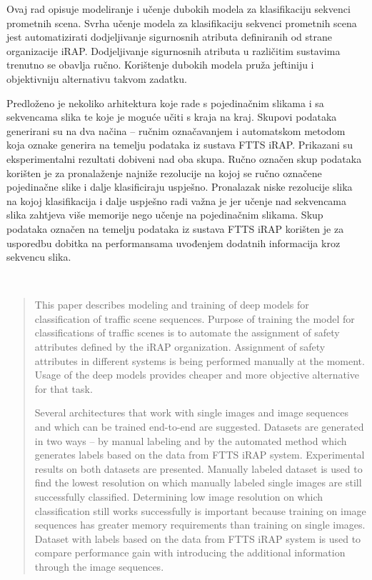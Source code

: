 \documentclass[times, utf8, diplomski, numeric]{fer}
\begin{document}
\begin{sazetak}
Ovaj rad opisuje modeliranje i učenje dubokih modela za klasifikaciju sekvenci prometnih scena.
Svrha učenje modela za klasifikaciju sekvenci prometnih scena jest automatizirati dodjeljivanje sigurnosnih atributa definiranih od strane organizacije iRAP.
Dodjeljivanje sigurnosnih atributa u različitim sustavima trenutno se obavlja ručno.
Korištenje dubokih modela pruža jeftiniju i objektivniju alternativu takvom zadatku.

Predloženo je nekoliko arhitektura koje rade s pojedinačnim slikama i sa sekvencama slika te koje je moguće učiti s kraja na kraj.
Skupovi podataka generirani su na dva načina -- ručnim označavanjem i automatskom metodom koja oznake generira na temelju podataka iz sustava FTTS iRAP.
Prikazani su eksperimentalni rezultati dobiveni nad oba skupa.
Ručno označen skup podataka korišten je za pronalaženje najniže rezolucije na kojoj se ručno označene pojedinačne slike i dalje klasificiraju uspješno. 
Pronalazak niske rezolucije slika na kojoj klasifikacija i dalje uspješno radi važna je jer učenje nad sekvencama slika zahtjeva više memorije nego učenje na pojedinačnim slikama.
Skup podataka označen na temelju podataka iz sustava FTTS iRAP korišten je za usporedbu dobitka na performansama uvođenjem dodatnih informacija kroz sekvencu slika.


 \\
\end{sazetak}

\newpage
\begin{abstract}
This paper describes modeling and training of deep models for classification of traffic scene sequences.
Purpose of training the model for classifications of traffic scenes is to automate the assignment of safety attributes defined by the iRAP organization.
Assignment of safety attributes in different systems is being performed manually at the moment.
Usage of the deep models provides cheaper and more objective alternative for that task.

Several architectures that work with single images and image sequences and which can be trained end-to-end are suggested.
Datasets are generated in two ways -- by manual labeling and by the automated method which generates labels based on the data from FTTS iRAP system.
Experimental results on both datasets are presented.
Manually labeled dataset is used to find the lowest resolution on which manually labeled single images are still successfully classified.
Determining low image resolution on which classification still works successfully is important because training on image sequences has greater memory requirements than training on single images.
Dataset with labels based on the data from FTTS iRAP system is used to compare performance gain with introducing the additional information through the image sequences.

\end{abstract}
\end{document}
